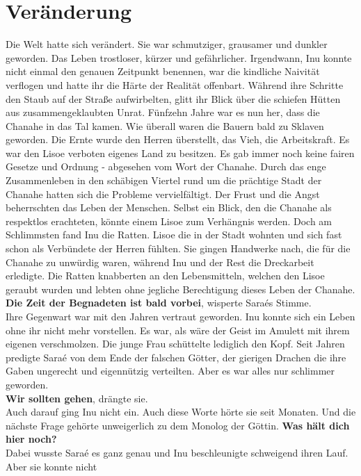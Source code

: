 \chapter{Veränderung}


Die Welt hatte sich verändert. Sie war schmutziger, grausamer und dunkler geworden. Das Leben 
trostloser, kürzer und gefährlicher. Irgendwann, Inu konnte nicht einmal den genauen Zeitpunkt 
benennen, war die kindliche Naivität verflogen und hatte ihr die Härte der Realität offenbart. 
Während ihre Schritte den Staub auf der Straße aufwirbelten, glitt ihr Blick über die schiefen 
Hütten aus zusammengeklaubten Unrat. Fünfzehn Jahre war es nun her, dass die Chanahe in das Tal 
kamen. Wie überall waren die Bauern bald zu Sklaven geworden. Die Ernte wurde den Herren 
überstellt, das Vieh, die Arbeitskraft. Es war den Lisoe verboten eigenes Land zu besitzen. Es gab 
immer noch keine fairen Gesetze und Ordnung - abgesehen vom Wort der Chanahe. Durch das enge 
Zusammenleben in den schäbigen Viertel rund um die prächtige Stadt der Chanahe hatten sich die 
Probleme vervielfältigt. Der Frust und die Angst beherrschten das Leben der Menschen. Selbst ein 
Blick, den die Chanahe als respektlos erachteten, könnte einem Lisoe zum Verhängnis werden. Doch am 
Schlimmsten fand Inu die Ratten. Lisoe die in der Stadt wohnten und sich fast schon als Verbündete 
der Herren fühlten. Sie gingen Handwerke nach, die für die Chanahe zu unwürdig waren, während Inu 
und der Rest die Dreckarbeit erledigte. Die Ratten knabberten an den Lebensmitteln, welchen den 
Lisoe geraubt wurden und lebten ohne jegliche Berechtigung dieses Leben der Chanahe.\\
\textbf{Die Zeit der Begnadeten ist bald vorbei}, wisperte Saraés Stimme.\\
Ihre Gegenwart war mit den Jahren vertraut geworden. Inu konnte sich ein Leben ohne ihr nicht mehr 
vorstellen. Es war, als wäre der Geist im Amulett mit ihrem eigenen verschmolzen. Die junge Frau 
schüttelte lediglich den Kopf. Seit Jahren predigte Saraé von dem Ende der falschen Götter, der 
gierigen Drachen die ihre Gaben ungerecht und eigennützig verteilten. Aber es war alles nur 
schlimmer geworden. \\
\textbf{Wir sollten gehen}, drängte sie.\\
Auch darauf ging Inu nicht ein. Auch diese Worte hörte sie seit Monaten. Und die nächste Frage 
gehörte unweigerlich zu dem Monolog der Göttin. \textbf{Was hält dich hier noch?}\\
Dabei wusste Saraé es ganz genau und Inu beschleunigte schweigend ihren Lauf. Aber sie konnte nicht 
